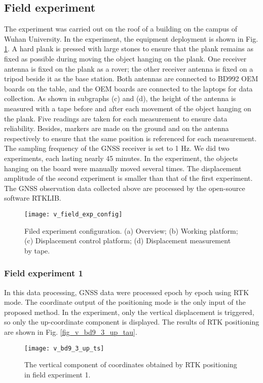 \documentclass{svjour3}                     %
\begin{document}
\subsection{Field experiment}
The experiment was carried out on the roof of a building on the campus of Wuhan University. In the experiment, the equipment deployment is shown in Fig. \ref{fig_v_field_exp_config}. A hard plank is pressed with large stones to ensure that the plank remains as fixed as possible during moving the object hanging on the plank. One receiver antenna is fixed on the plank as a rover; the other receiver antenna is fixed on a tripod beside it as the base station. Both antennas are connected to BD992 OEM boards on the table, and the OEM boards are connected to the laptops for data collection. 
As shown in subgraphs (c) and (d), the height of the antenna is measured with a tape before and after each movement of the object hanging on the plank. Five readings are taken for each measurement to ensure data reliability.
Besides, markers are made on the ground and on the antenna respectively to ensure that the same position is referenced for each measurement. The sampling frequency of the GNSS receiver is set to 1 Hz. 
We did two experiments, each lasting nearly 45 minutes. In the experiment, the objects hanging on the board were manually moved several times. The displacement amplitude of the second experiment is smaller than that of the first experiment.
The GNSS observation data collected above are processed by the open-source software RTKLIB\citep{takasu2011rtklib}. 
\begin{figure}[htbp]
	\centering
	\texttt{[image: v\_field\_exp\_config]}
	\caption{Filed experiment configuration. (a) Overview; (b) Working platform; (c) Displacement control platform; (d) Displacement measurement by tape. }
	\label{fig_v_field_exp_config}
\end{figure} 

\subsubsection{Field experiment 1}
In this data processing, GNSS data were processed epoch by epoch using RTK mode. The coordinate output of the positioning mode is the only input of the proposed method. In the experiment, only the vertical displacement is triggered, so only the up-coordinate component is displayed. The results of RTK positioning are shown in Fig. \ref{fig_v_bd9_3_up_tau}.
\begin{figure}[htbp]
	\centering
	\texttt{[image: v\_bd9\_3\_up\_ts]}
	\caption{The vertical component of coordinates obtained by RTK positioning in field experiment 1.}
	\label{fig_v_bd9_3_up_ts}
\end{figure} 
\end{document}
